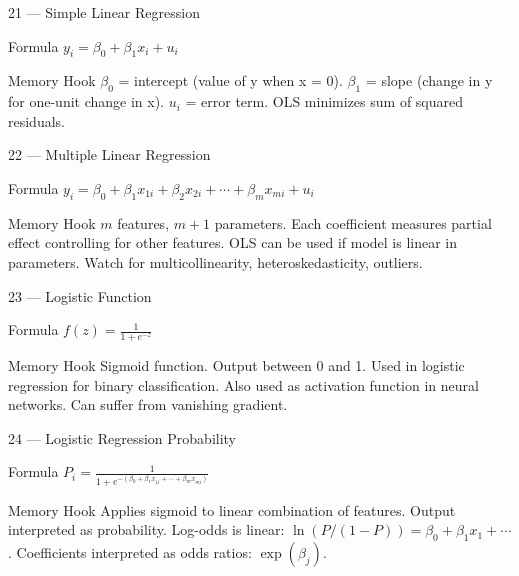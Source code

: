 \documentclass[aspectratio=169,8pt]{beamer}
\begin{document}
	\begin{frame}{21 --- Simple Linear Regression}
		\begin{block}{Formula}
			$y_i = \beta_0 + \beta_1 x_i + u_i$
		\end{block}
		\begin{block}{Memory Hook}
			$\beta_0$ = intercept (value of y when x = 0). $\beta_1$ = slope (change in y for one-unit change in x). $u_i$ = error term. OLS minimizes sum of squared residuals.
		\end{block}
	\end{frame}
	
	\begin{frame}{22 --- Multiple Linear Regression}
		\begin{block}{Formula}
			$y_i = \beta_0 + \beta_1 x_{1i} + \beta_2 x_{2i} + \cdots + \beta_m x_{mi} + u_i$
		\end{block}
		\begin{block}{Memory Hook}
			$m$ features, $m+1$ parameters. Each coefficient measures partial effect controlling for other features. OLS can be used if model is linear in parameters. Watch for multicollinearity, heteroskedasticity, outliers.
		\end{block}
	\end{frame}
	
	\begin{frame}{23 --- Logistic Function}
		\begin{block}{Formula}
			$f(z) = \frac{1}{1 + e^{-z}}$
		\end{block}
		\begin{block}{Memory Hook}
			Sigmoid function. Output between 0 and 1. Used in logistic regression for binary classification. Also used as activation function in neural networks. Can suffer from vanishing gradient.
		\end{block}
	\end{frame}
	
	\begin{frame}{24 --- Logistic Regression Probability}
		\begin{block}{Formula}
			$P_i = \frac{1}{1 + e^{-(\beta_0 + \beta_1 x_{1i} + \cdots + \beta_m x_{mi})}}$
		\end{block}
		\begin{block}{Memory Hook}
			Applies sigmoid to linear combination of features. Output interpreted as probability. Log-odds is linear: $\ln(P/(1-P)) = \beta_0 + \beta_1 x_1 + \cdots$. Coefficients interpreted as odds ratios: $\exp(\beta_j)$.
		\end{block}
	\end{frame}
	
\end{document}

